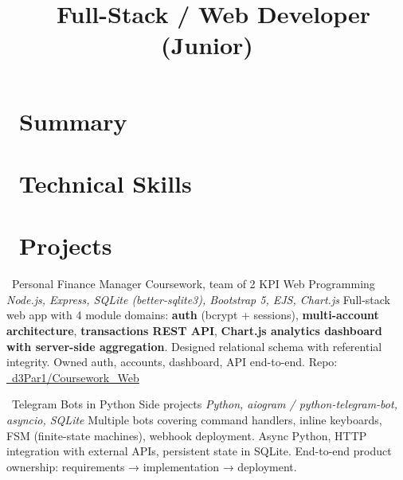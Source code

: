 \documentclass[10pt,a4paper,sans]{moderncv}
\title{\faCode\ Full-Stack / Web Developer (Junior)}
\begin{document}
\makecvtitle
\vspace{-1.2em}

\section{\faUser\ Summary}

\section{\faCogs\ Technical Skills}

\section{\faFolderOpen\ Projects}

        {\faChartLine\ Personal Finance Manager}
        {Coursework, team of 2}
        {KPI Web Programming}
        {\textit{Node.js, Express, SQLite (better-sqlite3), Bootstrap 5, EJS, Chart.js}}
        {\small Full-stack web app with 4 module domains: \textbf{auth} (bcrypt + sessions), \textbf{multi-account architecture}, \textbf{transactions REST API}, \textbf{Chart.js analytics dashboard with server-side aggregation}. Designed relational schema with referential integrity. Owned auth, accounts, dashboard, API end-to-end. Repo: \href{https://github.com/d3Par1/Coursework_Web}{\faGithub\ d3Par1/Coursework\_Web}}

        {\faRobot\ Telegram Bots in Python}
        {Side projects}
        {}
        {\textit{Python, aiogram / python-telegram-bot, asyncio, SQLite}}
        {\small Multiple bots covering command handlers, inline keyboards, FSM (finite-state machines), webhook deployment. Async Python, HTTP integration with external APIs, persistent state in SQLite. End-to-end product ownership: requirements → implementation → deployment.}
\end{document}
